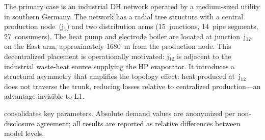 \documentclass[review,3p]{elsarticle}
\begin{document}
The primary case is an industrial DH network operated by a
medium-sized utility in southern Germany. The network has a radial
tree structure with a central production node~(j$_1$) and two
distribution arms (15~junctions, 14~pipe segments, 27~consumers). The
heat pump and electrode boiler are located at junction~j$_{12}$ on the
East arm, approximately \SI{1680}{\metre} from the production node.
This decentralized placement is operationally motivated: j$_{12}$ is
adjacent to the industrial waste-heat source supplying the HP
evaporator. It introduces a structural asymmetry that amplifies the
topology effect: heat produced at~j$_{12}$ does not traverse the
trunk, reducing losses relative to centralized production---an
advantage invisible to L1.

 consolidates key parameters. Absolute demand
values are anonymized per non-disclosure agreement; all results are
reported as relative differences between model levels.
\end{document}
